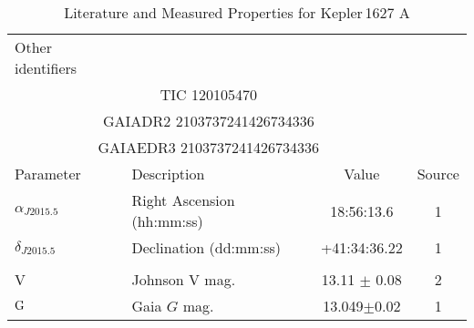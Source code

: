 \begin{table*}
\scriptsize
\setlength{\tabcolsep}{2pt}
\centering
\caption{Literature and Measured Properties for Kepler$\,$1627 A}
\label{tab:starparams}
\begin{tabular}{llcc}
  \hline
  \hline
Other identifiers\dotfill & \\
\multicolumn{3}{c}{TIC 120105470} \\
\multicolumn{3}{c}{GAIADR2 2103737241426734336} \\
\multicolumn{3}{c}{GAIAEDR3 2103737241426734336} \\
\hline
\hline
Parameter & Description & Value & Source\\
\hline 
$\alpha_{J2015.5}$\dotfill	&Right Ascension (hh:mm:ss)\dotfill & 18:56:13.6 & 1	\\
$\delta_{J2015.5}$\dotfill	&Declination (dd:mm:ss)\dotfill & +41:34:36.22 & 1	\\
\\
V\dotfill			&Johnson V mag.\dotfill & 13.11 $\pm$ 0.08		& 2	\\
${\rm G}$\dotfill     & Gaia $G$ mag.\dotfill     & 13.049$\pm$0.02 & 1\\

\end{tabular}
\end{table*}
